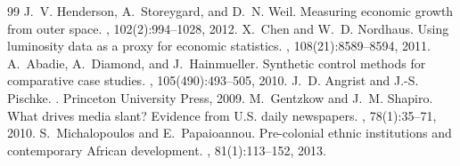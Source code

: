 \documentclass[11pt,a4paper]{article}
\theoremstyle{definition}
\begin{document}
\begin{thebibliography}{99}
J.~V. Henderson, A.~Storeygard, and D.~N. Weil.
\newblock Measuring economic growth from outer space.
, 102(2):994--1028, 2012.
X.~Chen and W.~D. Nordhaus.
\newblock Using luminosity data as a proxy for economic statistics.
, 108(21):8589--8594, 2011.
A.~Abadie, A.~Diamond, and J.~Hainmueller.
\newblock Synthetic control methods for comparative case studies.
, 105(490):493--505, 2010.
J.~D. Angrist and J.-S. Pischke.
.
\newblock Princeton University Press, 2009.
M.~Gentzkow and J.~M. Shapiro.
\newblock What drives media slant? Evidence from U.S. daily newspapers.
, 78(1):35--71, 2010.
S.~Michalopoulos and E.~Papaioannou.
\newblock Pre-colonial ethnic institutions and contemporary African development.
, 81(1):113--152, 2013.
\end{thebibliography}
\end{document}
